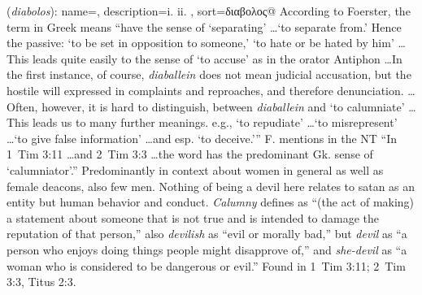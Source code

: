 \item[devil (he/she),]

(\textit{diabolos}):
{
    name=,
    description={i.  ii. },
    sort=διαβολος@
}
According to Foerster, the term in Greek means ``have the sense of `separating' \ldots `to separate from.' Hence the passive: `to be set in opposition to someone,' `to hate or be hated by him' \ldots This leads quite easily to the sense of `to accuse' as in the orator Antiphon \ldots In the first instance, of course, \emph{diaballein} does not mean judicial accusation, but the hostile will expressed in complaints and reproaches, and therefore denunciation. \ldots Often, however, it is hard to distinguish, between \emph{diaballein} and `to calumniate' \ldots This leads us to many further meanings. e.g., `to repudiate' \ldots `to misrepresent' \ldots `to give false information' \ldots and esp. `to deceive.'''  
F. mentions in the NT ``In 1~Tim 3:11 \ldots and 2~Tim 3:3 \ldots the word has the predominant Gk. sense of `calumniator'.''  
Predominantly in context about women in general as well as female deacons, also few men. Nothing of being a devil here relates to satan as an entity but human behavior and conduct. \emph{Calumny} defines as ``(the act of making) a statement about someone that is not true and is intended to damage the reputation of that person,'' also \emph{devilish} as ``evil or morally bad,'' but \emph{devil} as ``a person who enjoys doing things people might disapprove of,'' and \emph{she-devil} as ``a woman who is considered to be dangerous or evil.''
Found in 1~Tim 3:11; 2~Tim 3:3, Titus 2:3.
